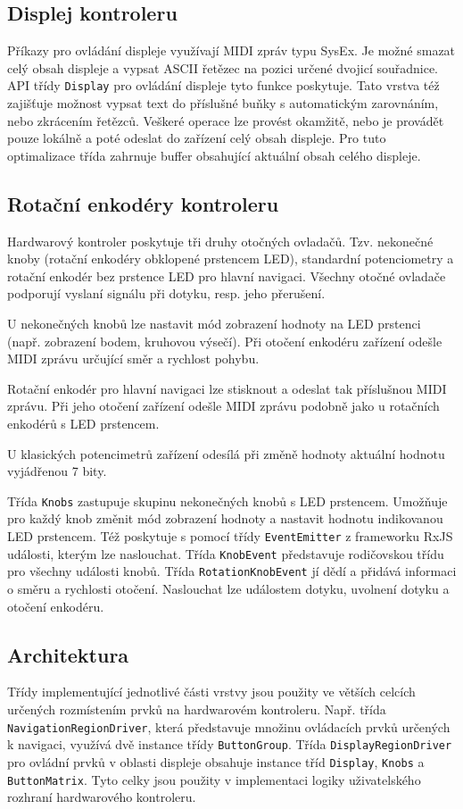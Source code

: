 \documentclass[thesis=M,czech]{FITthesis}[2019/03/06]
\begin{document}
		\subsection{Displej kontroleru}
		Příkazy pro ovládání displeje využívají MIDI zpráv typu SysEx. Je možné smazat celý obsah displeje a 
		vypsat ASCII řetězec na pozici určené dvojicí souřadnice. API třídy \texttt{Display} pro ovládání displeje tyto funkce poskytuje.
		Tato vrstva též zajišťuje možnost vypsat text do příslušné buňky s automatickým zarovnáním, nebo zkrácením řetězců.
		Veškeré operace lze provést okamžitě, nebo je provádět pouze lokálně a poté odeslat do zařízení celý obsah displeje.
		Pro tuto optimalizace třída zahrnuje buffer obsahující aktuální obsah celého displeje.

		\subsection{Rotační enkodéry kontroleru}
		Hardwarový kontroler poskytuje tři druhy otočných ovladačů. Tzv. nekonečné knoby (rotační enkodéry obklopené
		prstencem LED), standardní potenciometry a rotační enkodér bez prstence LED pro hlavní navigaci.
		Všechny otočné ovladače podporují vyslaní signálu při dotyku, resp. jeho přerušení. 
		
		U nekonečných knobů lze nastavit mód zobrazení hodnoty na LED prstenci (např. zobrazení bodem, kruhovou výsečí).
		Při otočení enkodéru zařízení odešle MIDI zprávu určující směr a rychlost pohybu.
		
		Rotační enkodér pro	hlavní navigaci lze stisknout a odeslat tak příslušnou MIDI zprávu. Při jeho otočení
		zařízení odešle MIDI zprávu podobně jako u rotačních enkodérů s LED prstencem.
		
		U klasických potencimetrů zařízení odesílá při změně hodnoty aktuální hodnotu vyjádřenou 7 bity.
		
		Třída \texttt{Knobs} zastupuje skupinu nekonečných knobů s LED prstencem. Umožňuje pro každý knob změnit mód zobrazení hodnoty a
		nastavit hodnotu indikovanou LED prstencem. Též poskytuje s pomocí třídy \texttt{EventEmitter} z frameworku RxJS události, kterým lze naslouchat.
		Třída \texttt{KnobEvent} představuje rodičovskou třídu pro všechny události knobů. Třída \texttt{Rotation\-Knob\-Event} jí dědí a přidává informaci
		o směru a rychlosti otočení. Naslouchat lze událostem dotyku, uvolnení dotyku a otočení enkodéru.
		
		\subsection{Architektura}
		Třídy implementující jednotlivé části vrstvy jsou použity ve větších celcích určených rozmístením prvků na hardwarovém kontroleru.
		Např. třída \linebreak	\texttt{Navigation\-Region\-Driver}, která představuje množinu ovládacích prvků určených k navigaci, využívá dvě instance třídy \texttt{ButtonGroup}.
		Třída \texttt{DisplayRegionDriver} pro ovládní prvků v oblasti displeje obsahuje instance tříd \texttt{Display}, \texttt{Knobs} a \texttt{ButtonMatrix}.
		Tyto celky jsou použity v implementaci logiky uživatelského rozhraní hardwarového kontroleru.
		
\end{document}
